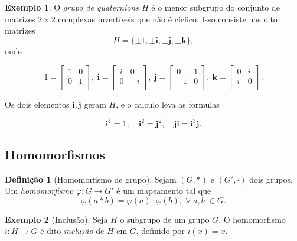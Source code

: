 \documentclass[a4paper,12pt]{report}
\theoremstyle{plain}
\theoremstyle{definition}
\newtheorem{definicao}{Definição}[section]
\newtheorem{exemplo}{Exemplo}[section]
\begin{document}
\begin{exemplo}
	O \emph{grupo de quaternions \(H\)} é o menor subgrupo
	do conjunto de matrizes \(2\times 2\) complexas invertíveis que não é
	cíclico. Isso consiste nas oito matrizes
	\[H = \{\pm 1, \pm \mathbf{i}, \pm \mathbf{j}, \pm \mathbf{k}\},\] onde
	
	\[
	1=
	\begin{bmatrix}
		1 & 0 \\
		0 & 1 \\
	\end{bmatrix},
	\ \mathbf{i}=
	\begin{bmatrix}
		i & 0 \\
		0 & -i \\
	\end{bmatrix},
	\ \mathbf{j}=
	\begin{bmatrix}
		0 & 1 \\
		-1 & 0 \\
	\end{bmatrix},
	\ \mathbf{k}=
	\begin{bmatrix}
		0 & i \\
		i & 0 \\
	\end{bmatrix}.
	\]
	
	Os dois elementos \(\mathbf{i}, \mathbf{j}\) geram \(H\), e o calculo
	leva as formulas
	
	\[\mathbf{i}^4 = 1, \quad \mathbf{i}^2 = \mathbf{j}^2, \quad \mathbf{j}\mathbf{i} = \mathbf{i}^3\mathbf{j}.\]
\end{exemplo}

\subsection{Homomorfismos}

\begin{definicao}[Homomorfismo de grupo]
	Sejam \((G,*)\) e \((G',\cdot)\) dois grupos. Um \emph{homomorfismo} \(\varphi: G\longrightarrow G'\) é um mapeamento tal que
	\begin{equation}\tag{propriedade de homomorfismo}
		\varphi(a*b) = \varphi(a)\cdot\varphi(b), \; \forall \; a,b\; \in G.
	\end{equation}
\end{definicao}

\begin{exemplo}[Inclusão]
	Seja \(H\) o subgrupo de um grupo \(G\). O homomorfismo \(i: H \longrightarrow G\) é dito \emph{inclusão} de \(H\) em \(G\), definido por \(i(x) = x\).
\end{exemplo}
\end{document}
